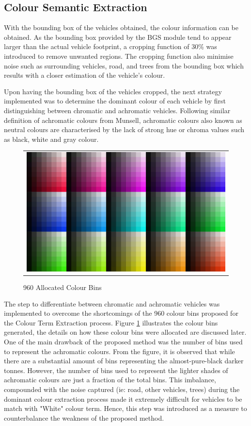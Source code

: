 \subsection{Colour Semantic Extraction }
\label{section:versionOneColorExtract}

With the bounding box of the vehicles obtained, the colour information can be obtained.
As the bounding box provided by the BGS module tend to appear larger than the actual vehicle footprint, a cropping function of 30\% was introduced to remove unwanted regions.
The cropping function also minimise noise such as surrounding vehicles, road, and trees from the bounding box which results with a closer estimation of the vehicle's colour.

Upon having the bounding box of the vehicles cropped, the next strategy implemented was to determine the dominant colour of each vehicle by first distinguishing between chromatic and achromatic vehicles. Following similar definition of achromatic colours from Munsell, achromatic colours also known as neutral colours are characterised by the lack of strong hue or chroma values such as black, white and gray colour.

\begin{figure}[htb!]
  \centering
\begin{tabular}{c}
 \includegraphics[width=0.7\linewidth]{image/retrievalOne/all.png} \\
\end{tabular}
\caption{960 Allocated Colour Bins} \label{fig:hsvAllocated}
\end{figure}

The step to differentiate between chromatic and achromatic vehicles was implemented to overcome the shortcomings of the 960 colour bins proposed for the Colour Term Extraction process. Figure \ref{fig:hsvAllocated} illustrates the colour bins generated, the details on how these colour bins were allocated are discussed later. One of the main drawback of the proposed method was the number of bins used to represent the achromatic colours. From the figure, it is observed that while there are a substantial amount of bins representing the almost-pure-black darker tonnes. However, the number of bins used to represent the lighter shades of achromatic colours are just a fraction of the total bins.
This imbalance, compounded with the noise captured (ie: road, other vehicles, trees) during the dominant colour extraction process made it extremely difficult for vehicles to be match with "White" colour term. Hence, this step was introduced as a measure to counterbalance the weakness of the proposed method.


